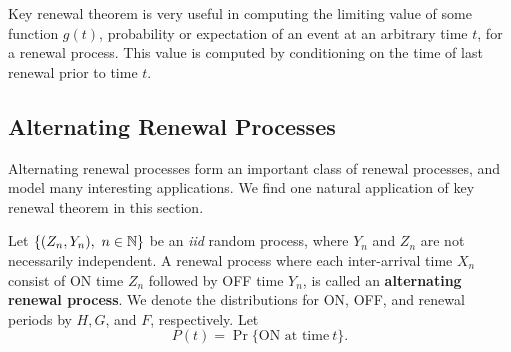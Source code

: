 \documentclass[a4paper,10pt,english]{article}
\begin{document}
Key renewal theorem is very useful in computing the limiting value of some function $g(t)$, probability or expectation of an event at an arbitrary time $t$, for a renewal process. This value is computed by conditioning on the time of last renewal prior to time $t$.

%

\subsection{Alternating Renewal Processes}
Alternating renewal processes form an important class of renewal processes, and model many interesting applications. 
We find one natural application of  key renewal theorem  in this section. 

Let $\{(Z_n,Y_n),~n \in \mathbb{N}\}$ be an \textit{iid} random process, where $Y_n$ and $Z_n$ are not necessarily independent. 
A renewal process where each inter-arrival time $X_n$ consist of ON time $Z_n$ followed by OFF time $Y_n$, is called an \textbf{alternating renewal process}. 
We denote the distributions for ON, OFF, and renewal periods by $H, G$, and $F$, respectively. Let 
\begin{equation*}
P(t)=\Pr\{\text{ON at time}~ t\}.
\end{equation*}
\end{document}
